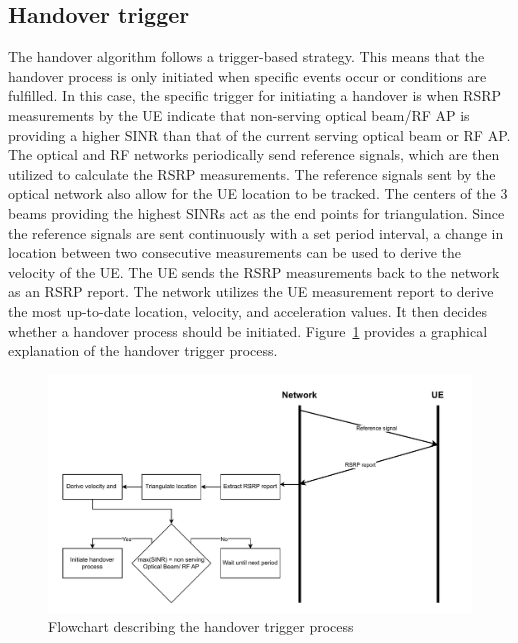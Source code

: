 \subsection{Handover trigger}
The handover algorithm follows a trigger-based strategy. This means that the handover process is only initiated when specific events occur or conditions are fulfilled. In this case, the specific trigger for initiating a handover is when RSRP measurements by the UE indicate that non-serving optical beam/RF AP is providing a higher SINR than that of the current serving optical beam or RF AP. The optical and RF networks periodically send reference signals, which are then utilized to calculate the RSRP measurements. The reference signals sent by the optical network also allow for the UE location to be tracked. The centers of the 3 beams providing the highest SINRs act as the end points for triangulation. Since the reference signals are sent continuously with a set period interval, a change in location between two consecutive measurements can be used to derive the velocity of the UE. The UE sends the RSRP measurements back to the network as an RSRP report. The network utilizes the UE measurement report to derive the most up-to-date location, velocity, and acceleration values. It then decides whether a handover process should be initiated. Figure~\ref{fig: handover-trigger} provides a graphical explanation of the handover trigger process.
% 
\begin{figure}
    \centering
    \includegraphics[width=1\linewidth]{Figures/Algorithm-design-Handover-trigger.drawio.pdf}
    \caption{Flowchart describing the handover trigger process}
    \label{fig: handover-trigger}
\end{figure}

